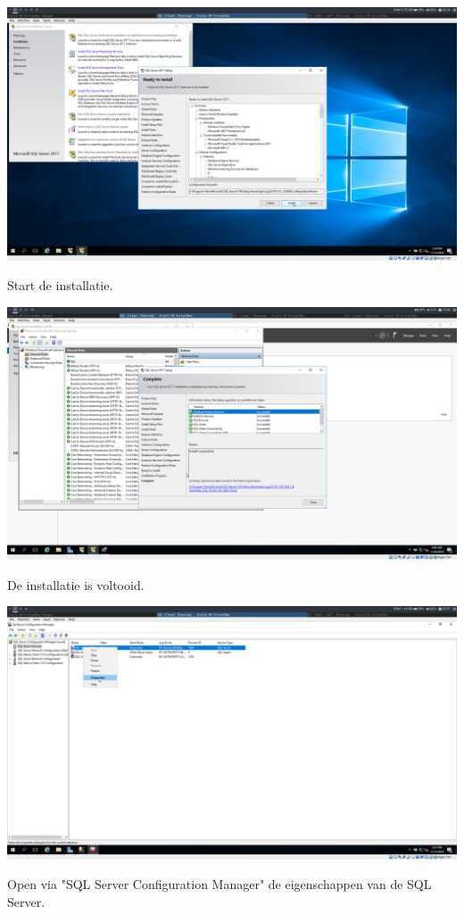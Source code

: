 \documentclass[a4paper]{article}
\begin{document}
\begin{center}
	\includegraphics[width=15cm]{Pictures/SQL/1542317645.png}
	
	Start de installatie.
\end{center}
\begin{center}
	\includegraphics[width=15cm]{Pictures/SQL/1543409333.png}
	
	De installatie is voltooid.
\end{center}
\begin{center}
	\includegraphics[width=15cm]{Pictures/SQL/1542322667.png}
	
	Open via "SQL Server Configuration Manager" de eigenschappen van de SQL Server.
\end{center}
\end{document}
